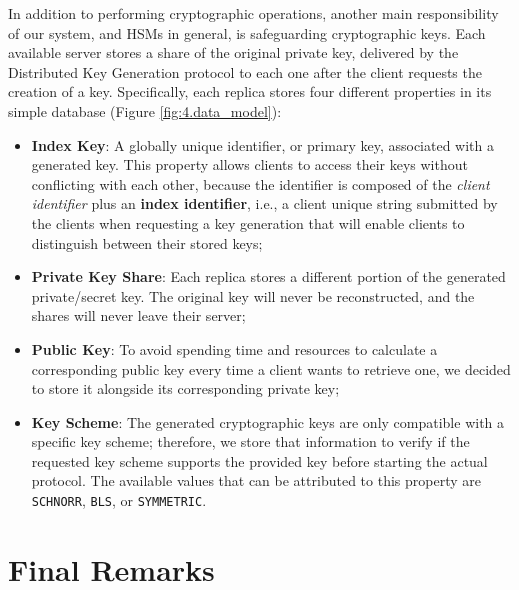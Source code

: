 In addition to performing cryptographic operations, another main responsibility of our system, and HSMs in general, is safeguarding cryptographic keys. Each available server stores a share of the original private key, delivered by the Distributed Key Generation protocol to each one after the client requests the creation of a key. Specifically, each replica stores four different properties in its simple database (Figure \ref{fig:4.data_model}):
\begin{itemize}
    \item \textbf{Index Key}: A globally unique identifier, or primary key, associated with a generated key. This property allows clients to access their keys without conflicting with each other, because the identifier is composed of the \textit{client identifier} plus an \textbf{index identifier}, i.e., a client unique string submitted by the clients when requesting a key generation that will enable clients to distinguish between their stored keys;

    \item \textbf{Private Key Share}: Each replica stores a different portion of the generated private/secret key. The original key will never be reconstructed, and the shares will never leave their server;

    \item \textbf{Public Key}: To avoid spending time and resources to calculate a corresponding public key every time a client wants to retrieve one, we decided to store it alongside its corresponding private key;

    \item \textbf{Key Scheme}: The generated cryptographic keys are only compatible with a specific key scheme; therefore, we store that information to verify if the requested key scheme supports the provided key before starting the actual protocol. The available values that can be attributed to this property are \texttt{SCHNORR}, \texttt{BLS}, or \texttt{SYMMETRIC}.
\end{itemize}



\section{Final Remarks} \label{sec:design-final-remarks}


